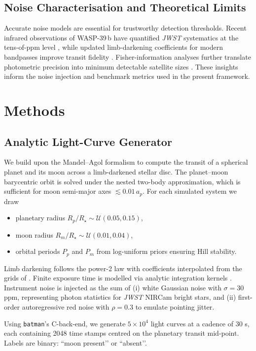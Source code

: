 \documentclass[11pt]{article}
\begin{document}
\subsection{Noise Characterisation and Theoretical Limits}
Accurate noise models are essential for trustworthy detection thresholds.  Recent infrared observations of WASP-39\,b have quantified \textit{JWST} systematics at the tens-of-ppm level \citep{Rustamkulov2024}, while updated limb-darkening coefficients for modern bandpasses improve transit fidelity \citep{Claret2023}.  Fisher-information analyses further translate photometric precision into minimum detectable satellite sizes \citep{PriceRogers2014}.  These insights inform the noise injection and benchmark metrics used in the present framework.

\section{Methods}\label{sec:methods}
\subsection{Analytic Light-Curve Generator}
We build upon the Mandel–Agol formalism to compute the transit of a spherical planet and its moon across a limb-darkened stellar disc.  The planet–moon barycentric orbit is solved under the nested two-body approximation, which is sufficient for moon semi-major axes $\lesssim0.01\,a_p$.  For each simulated system we draw
\begin{itemize}
	\item planetary radius $R_p/R_\star \sim \mathcal{U}(0.05,0.15)$,
	\item moon radius $R_m/R_\star \sim \mathcal{U}(0.01,0.04)$,
	\item orbital periods $P_p$ and $P_m$ from log-uniform priors ensuring Hill stability.
\end{itemize}
Limb darkening follows the power-2 law with coefficients interpolated from the grids of \citet{Claret2023}.  Finite exposure time is modelled via analytic integration kernels \citep{PriceRogers2014}.  Instrument noise is injected as the sum of (i) white Gaussian noise with $\sigma\!\!=\!30$ ppm, representing photon statistics for \textit{JWST} NIRCam bright stars, and (ii) first-order autoregressive red noise with $\rho\!=\!0.3$ to emulate pointing jitter.

Using \texttt{batman}’s C-back-end, we generate $5\times10^4$ light curves at a cadence of 30 s, each containing 2048 time stamps centred on the planetary transit mid-point.  Labels are binary: ``moon present’’ or ``absent’’.
\end{document}
